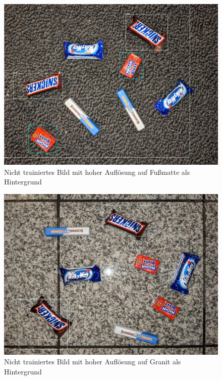     \begin{figure}[H]
        \centering
        \includegraphics[angle = 90, width = \textwidth]{Bilder/models/model_comparison/ssd_mobilenet_v1_fpn_640x640_coco17_tpu-8/HD_on_doormat.jpg}
        \caption{Nicht trainiertes Bild mit hoher Auflösung auf Fußmatte als Hintergrund}
    \end{figure}
    
    \begin{figure}[H]
        \centering
        \includegraphics[angle = 90, width = \textwidth]{Bilder/models/model_comparison/ssd_mobilenet_v1_fpn_640x640_coco17_tpu-8/HD_on_granite.jpg}
        \caption{Nicht trainiertes Bild mit hoher Auflösung auf Granit als Hintergrund}
    \end{figure}
    
